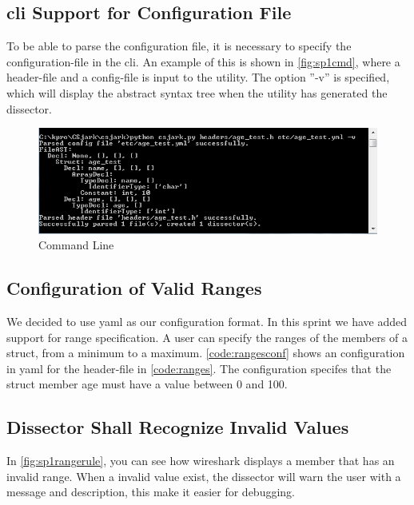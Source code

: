 \subsection{\gls{cli} Support for Configuration File}
To be able to parse the configuration file, it is necessary to specify the 
configuration-file in the \gls{cli}. An example of this is shown in 
\autoref{fig:sp1cmd}, where a \gls{header}-file and a config-file is input to the 
\gls{utility}. The option ''-v'' is specified, which will display the abstract 
syntax tree when the \gls{utility} has generated the \gls{dissector}.

\begin{figure}[ht]
	\includegraphics[width=\textwidth]{./sprints/img/cmd_agetest_run}
	\caption{Command Line\label{fig:sp1cmd}}
\end{figure}

\subsection{Configuration of Valid Ranges}
We decided to use \gls{yaml} as our configuration format. In this sprint we have
added support for range specification. A user can specify the ranges of the
\glspl{member} of a \gls{struct}, from a minimum to a maximum. \autoref{code:rangesconf} 
shows an configuration in \gls{yaml} for the \gls{header}-file in \autoref{code:ranges}. 
The configuration specifes that the \gls{struct} \gls{member} age must have a value 
between 0 and 100.  





\subsection{Dissector Shall Recognize Invalid Values}
In \autoref{fig:sp1rangerule}, you can see how \Gls{wireshark} displays a \gls{member} that 
has an invalid range. When a invalid value exist, the \gls{dissector} will warn the 
user with a message and description, this make it easier for debugging.


